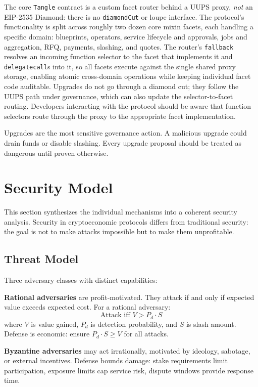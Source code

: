 \documentclass[11pt,a4paper]{article}
\begin{document}
The core \texttt{Tangle} contract is a custom facet router behind a UUPS proxy, \emph{not} an EIP-2535 Diamond: there is no \texttt{diamondCut} or loupe interface. The protocol's functionality is split across roughly two dozen core mixin facets, each handling a specific domain: blueprints, operators, service lifecycle and approvals, jobs and aggregation, RFQ, payments, slashing, and quotes. The router's \texttt{fallback} resolves an incoming function selector to the facet that implements it and \texttt{delegatecall}s into it, so all facets execute against the single shared proxy storage, enabling atomic cross-domain operations while keeping individual facet code auditable. Upgrades do not go through a diamond cut; they follow the UUPS path under governance, which can also update the selector-to-facet routing. Developers interacting with the protocol should be aware that function selectors route through the proxy to the appropriate facet implementation.

Upgrades are the most sensitive governance action. A malicious upgrade could drain funds or disable slashing. Every upgrade proposal should be treated as dangerous until proven otherwise.

\section{Security Model}

This section synthesizes the individual mechanisms into a coherent security analysis. Security in cryptoeconomic protocols differs from traditional security: the goal is not to make attacks impossible but to make them unprofitable.

\subsection{Threat Model}

Three adversary classes with distinct capabilities:

\textbf{Rational adversaries} are profit-motivated. They attack if and only if expected value exceeds expected cost. For a rational adversary:
\[
\text{Attack iff } V > P_d \cdot S
\]
where $V$ is value gained, $P_d$ is detection probability, and $S$ is slash amount. Defense is economic: ensure $P_d \cdot S \geq V$ for all attacks.

\textbf{Byzantine adversaries} may act irrationally, motivated by ideology, sabotage, or external incentives. Defense bounds damage: stake requirements limit participation, exposure limits cap service risk, dispute windows provide response time.
\end{document}
